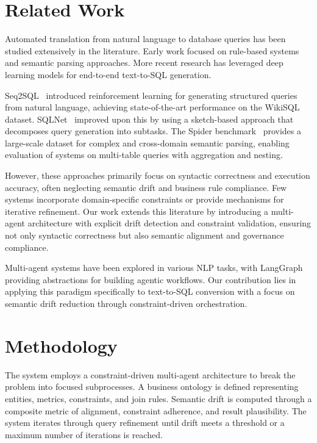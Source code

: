 \documentclass[conference]{IEEEtran}
\begin{document}
\section{Related Work}
\label{sec:related_work}

Automated translation from natural language to database queries has been studied extensively in the literature. Early work focused on rule-based systems and semantic parsing approaches. More recent research has leveraged deep learning models for end-to-end text-to-SQL generation.

Seq2SQL~\cite{seq2sql} introduced reinforcement learning for generating structured queries from natural language, achieving state-of-the-art performance on the WikiSQL dataset. SQLNet~\cite{sqlnet} improved upon this by using a sketch-based approach that decomposes query generation into subtasks. The Spider benchmark~\cite{spider} provides a large-scale dataset for complex and cross-domain semantic parsing, enabling evaluation of systems on multi-table queries with aggregation and nesting.

However, these approaches primarily focus on syntactic correctness and execution accuracy, often neglecting semantic drift and business rule compliance. Few systems incorporate domain-specific constraints or provide mechanisms for iterative refinement. Our work extends this literature by introducing a multi-agent architecture with explicit drift detection and constraint validation, ensuring not only syntactic correctness but also semantic alignment and governance compliance.

Multi-agent systems have been explored in various NLP tasks, with LangGraph~\cite{langgraph} providing abstractions for building agentic workflows. Our contribution lies in applying this paradigm specifically to text-to-SQL conversion with a focus on semantic drift reduction through constraint-driven orchestration.

\section{Methodology}
\label{sec:methodology}

The system employs a constraint-driven multi-agent architecture to break the problem into focused subprocesses. A business ontology is defined representing entities, metrics, constraints, and join rules. Semantic drift is computed through a composite metric of alignment, constraint adherence, and result plausibility. The system iterates through query refinement until drift meets a threshold or a maximum number of iterations is reached.
\end{document}
